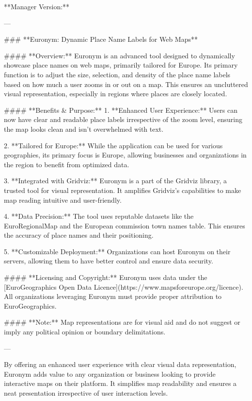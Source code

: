 **Manager Version:**

---

### **Euronym: Dynamic Place Name Labels for Web Maps**

#### **Overview:**
Euronym is an advanced tool designed to dynamically showcase place names on web maps, primarily tailored for Europe. Its primary function is to adjust the size, selection, and density of the place name labels based on how much a user zooms in or out on a map. This ensures an uncluttered visual representation, especially in regions where places are closely located.

#### **Benefits & Purpose:**
1. **Enhanced User Experience:** Users can now have clear and readable place labels irrespective of the zoom level, ensuring the map looks clean and isn’t overwhelmed with text.
   
2. **Tailored for Europe:** While the application can be used for various geographies, its primary focus is Europe, allowing businesses and organizations in the region to benefit from optimized data.

3. **Integrated with Gridviz:** Euronym is a part of the Gridviz library, a trusted tool for visual representation. It amplifies Gridviz's capabilities to make map reading intuitive and user-friendly.

4. **Data Precision:** The tool uses reputable datasets like the EuroRegionalMap and the European commission town names table. This ensures the accuracy of place names and their positioning.

5. **Customizable Deployment:** Organizations can host Euronym on their servers, allowing them to have better control and ensure data security.

#### **Licensing and Copyright:**
Euronym uses data under the [EuroGeographics Open Data Licence](https://www.mapsforeurope.org/licence). All organizations leveraging Euronym must provide proper attribution to EuroGeographics.

#### **Note:**
Map representations are for visual aid and do not suggest or imply any political opinion or boundary delimitations.

---

By offering an enhanced user experience with clear visual data representation, Euronym adds value to any organization or business looking to provide interactive maps on their platform. It simplifies map readability and ensures a neat presentation irrespective of user interaction levels.